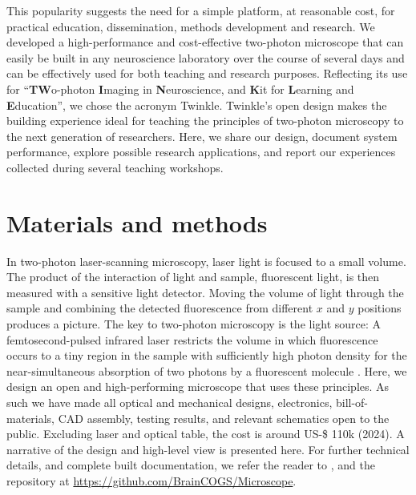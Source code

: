 \documentclass[10pt,letterpaper]{article}
\begin{document}
This popularity suggests the need for a simple platform, at reasonable cost, for practical education, dissemination, methods development and research. We developed a high-performance and cost-effective two-photon microscope that can easily be built in any neuroscience laboratory over the course of several days and can be effectively used for both teaching and research purposes. Reflecting its use for ``\textbf{TW}o-photon \textbf{I}maging in \textbf{N}euroscience, and \textbf{K}it for \textbf{L}earning and \textbf{E}ducation'', we chose the acronym Twinkle. Twinkle's open design makes the building experience ideal for teaching the principles of two-photon microscopy to the next generation of researchers. Here, we share our design, document system performance, explore possible research applications, and report our experiences collected during several teaching workshops.

\section*{Materials and methods}
In two-photon laser-scanning microscopy\cite{Denk1990}, laser light is focused to a small volume. The product of the interaction of light and sample, fluorescent light, is then measured with a sensitive light detector. Moving the volume of light through the sample and combining the detected fluorescence from different $x$ and $y$ positions produces a picture. The key to two-photon microscopy is the light source: A femtosecond-pulsed infrared laser restricts the volume in which fluorescence occurs to a tiny region in the sample with sufficiently high photon density for the near-simultaneous absorption of two photons by a fluorescent molecule \cite{Denk1990, Svoboda1997, So2000, Helmchen2005}.\newline
Here, we design an open and high-performing microscope that uses these principles. As such we have made all optical and mechanical designs, electronics, bill-of-materials, CAD assembly, testing results, and relevant schematics open to the public. Excluding laser and optical table, the cost is around US-\$ 110k (2024). A narrative of the design and high-level view is presented here. For further technical details, and complete built documentation, we refer the reader to , and the repository at \url{https://github.com/BrainCOGS/Microscope}.
\end{document}

